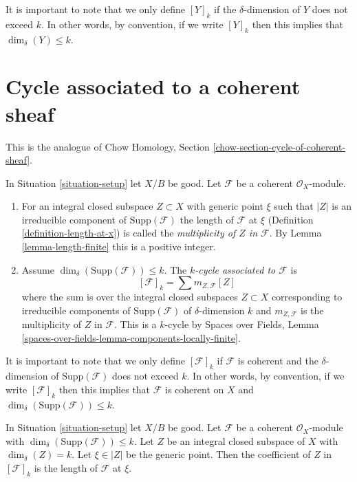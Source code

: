 \noindent
It is important to note that we only define $[Y]_k$ if the $\delta$-dimension
of $Y$ does not exceed $k$. In other words, by convention, if we write
$[Y]_k$ then this implies that $\dim_\delta(Y) \leq k$.







\section{Cycle associated to a coherent sheaf}
\label{section-cycle-of-coherent-sheaf}

\noindent
This is the analogue of
Chow Homology, Section \ref{chow-section-cycle-of-coherent-sheaf}.

\begin{definition}
\label{definition-cycle-associated-to-coherent-sheaf}
In Situation \ref{situation-setup} let $X/B$ be good.
Let $\mathcal{F}$ be a coherent $\mathcal{O}_X$-module.
\begin{enumerate}
\item For an integral closed subspace $Z \subset X$ with generic point $\xi$
such that $|Z|$ is an irreducible component of $\text{Supp}(\mathcal{F})$
the length of $\mathcal{F}$ at $\xi$ (Definition \ref{definition-length-at-x})
is called the {\it multiplicity of $Z$ in $\mathcal{F}$}.
By Lemma \ref{lemma-length-finite} this is a positive integer.
\item Assume $\dim_\delta(\text{Supp}(\mathcal{F})) \leq k$.
The {\it $k$-cycle associated to $\mathcal{F}$} is
$$
[\mathcal{F}]_k = \sum m_{Z, \mathcal{F}}[Z]
$$
where the sum is over the integral closed subspaces $Z \subset X$
corresponding to irreducible components of
$\text{Supp}(\mathcal{F})$ of $\delta$-dimension $k$
and $m_{Z, \mathcal{F}}$ is the multiplicity of $Z$ in $\mathcal{F}$.
This is a $k$-cycle by Spaces over Fields, Lemma
\ref{spaces-over-fields-lemma-components-locally-finite}.
\end{enumerate}
\end{definition}

\noindent
It is important to note that we only define $[\mathcal{F}]_k$
if $\mathcal{F}$ is coherent and the $\delta$-dimension
of $\text{Supp}(\mathcal{F})$ does not exceed $k$. In other words,
by convention, if we write $[\mathcal{F}]_k$ then this implies that
$\mathcal{F}$ is coherent on $X$ and
$\dim_\delta(\text{Supp}(\mathcal{F})) \leq k$.

\begin{lemma}
\label{lemma-reformulate-coeff-coherent}
In Situation \ref{situation-setup} let $X/B$ be good.
Let $\mathcal{F}$ be a coherent $\mathcal{O}_X$-module
with $\dim_\delta(\text{Supp}(\mathcal{F})) \leq k$.
Let $Z$ be an integral closed subspace of $X$ with $\dim_\delta(Z) = k$.
Let $\xi \in |Z|$ be the generic point.
Then the coefficient of $Z$ in $[\mathcal{F}]_k$
is the length of $\mathcal{F}$ at $\xi$.
\end{lemma}

